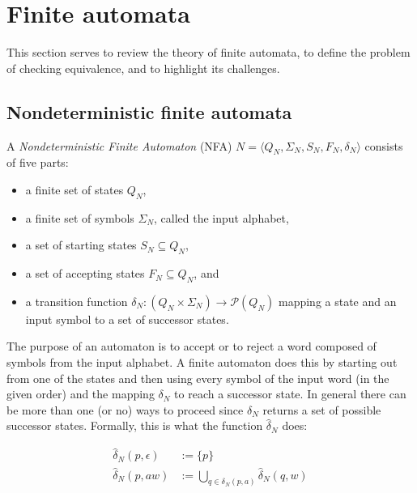 \section{Finite automata}

This section serves to review the theory of finite automata, to define the
problem of checking equivalence, and to highlight its challenges.

\subsection{Nondeterministic finite automata}

\begin{definition}
  A \emph{Nondeterministic Finite Automaton} (NFA) $N = \langle Q_N, \Sigma_N, S_N, F_N, \delta_N \rangle$ consists of five parts:

  \begin{itemize}
    \item a finite set of states $Q_N$,
    \item a finite set of symbols $\Sigma_N$, called the input alphabet,
    \item a set of starting states $S_N \subseteq Q_N$,
    \item a set of accepting states $F_N \subseteq Q_N$, and
    \item a transition function $\delta_N : (Q_N \times \Sigma_N) \to \mathcal{P}(Q_N)$ mapping a state and an input symbol
            to a set of successor states.
  \end{itemize}
\end{definition}

The purpose of an automaton is to accept or to reject a word
composed of symbols from the input alphabet.
A finite automaton does this by starting out from one of the
states and then using every symbol of the input word (in the given
order) and the mapping $\delta_N$ to reach a successor state.
In general there can be more than one (or no) ways to proceed since $\delta_N$ returns a set of possible successor states.
Formally, this is what the function $\hat{\delta}_N$ does:

\begin{definition}
  \begin{align*}
    \hat{\delta}_N(p, \epsilon) &:= \{p\}\\
    \hat{\delta}_N(p, aw) &:= \bigcup_{q \in \delta_N(p, a)}\hat{\delta}_N(q, w)
  \end{align*}
\end{definition}

